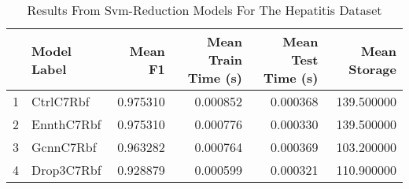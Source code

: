 \begin{table}
\centering
\caption{Results From Svm-Reduction Models For The Hepatitis Dataset}
\label{tab:svm_reduction_results_hepatitis}
\begin{tabular}{rlrrrr}
\toprule
 & Model Label & Mean F1 & Mean Train Time (s) & Mean Test Time (s) & Mean Storage \\
\midrule
1 & CtrlC7Rbf & 0.975310 & 0.000852 & 0.000368 & 139.500000 \\
2 & EnnthC7Rbf & 0.975310 & 0.000776 & 0.000330 & 139.500000 \\
3 & GcnnC7Rbf & 0.963282 & 0.000764 & 0.000369 & 103.200000 \\
4 & Drop3C7Rbf & 0.928879 & 0.000599 & 0.000321 & 110.900000 \\
\bottomrule
\end{tabular}
\end{table}
